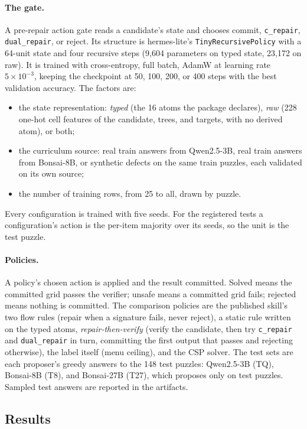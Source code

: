 \documentclass[11pt]{article}
\begin{document}
\paragraph{The gate.} A pre-repair action gate reads a candidate's state and chooses commit, \texttt{c\_repair}, \texttt{dual\_repair}, or reject. Its structure is hermes-lite's \texttt{TinyRecursivePolicy} with a 64-unit state and four recursive steps (9{,}604 parameters on typed state, 23{,}172 on raw). It is trained with cross-entropy, full batch, AdamW at learning rate $5\times10^{-3}$, keeping the checkpoint at 50, 100, 200, or 400 steps with the best validation accuracy. The factors are:
\begin{itemize}[leftmargin=*]
  \item the state representation: \emph{typed} (the 16 atoms the package declares), \emph{raw} (228 one-hot cell features of the candidate, trees, and targets, with no derived atom), or both;
  \item the curriculum source: real train answers from Qwen2.5-3B, real train answers from Bonsai-8B, or synthetic defects on the same train puzzles, each validated on its own source;
  \item the number of training rows, from 25 to all, drawn by puzzle.
\end{itemize}
Every configuration is trained with five seeds. For the registered tests a configuration's action is the per-item majority over its seeds, so the unit is the test puzzle.

\paragraph{Policies.} A policy's chosen action is applied and the result committed. Solved means the committed grid passes the verifier; unsafe means a committed grid fails; rejected means nothing is committed. The comparison policies are the published skill's two flow rules (repair when a signature fails, never reject), a static rule written on the typed atoms, \emph{repair-then-verify} (verify the candidate, then try \texttt{c\_repair} and \texttt{dual\_repair} in turn, committing the first output that passes and rejecting otherwise), the label itself (menu ceiling), and the CSP solver. The test sets are each proposer's greedy answers to the 148 test puzzles: Qwen2.5-3B (TQ), Bonsai-8B (T8), and Bonsai-27B (T27), which proposes only on test puzzles. Sampled test answers are reported in the artifacts.

\subsection{Results}
\end{document}
